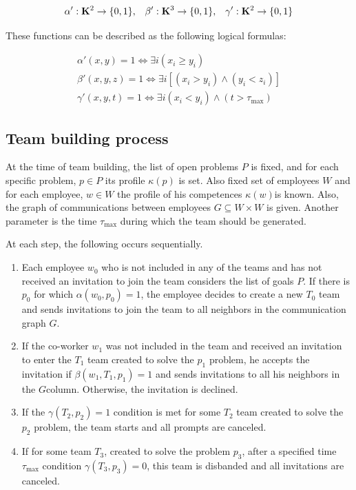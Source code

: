 \documentclass[12pt]{report}
\theoremstyle{definition}
\begin{document}
\begin{eqnarray} \label{eq:team5}
\alpha': {\bf K} ^2 \to \{0, 1\},\;\;\;
\beta': {\bf K} ^3 \to \{0, 1\},\;\;\;
\gamma': {\bf K} ^2 \to \{0, 1\}
\end{eqnarray}

These functions can be described as the following logical formulas:

\begin{eqnarray} \label{eq:team6}
\alpha'(x,y)=1 \iff \exists i (x_i \geq y_i) \\
\beta'(x,y,z)=1 \iff \exists i [(x_i > y_i) \wedge (y_i < z_i)]  \\
\gamma'(x,y,t)=1 \iff \exists i (x_i < y_i)  \wedge (t > \tau_{\max})
\end{eqnarray}

\subsection{Team building process}

At the time of team building, the list of open problems ${P}$ is fixed, and for each specific problem, $p\in {P}$ its profile $\kappa(p)$ is set. 
Also fixed set of employees $W$ and for each employee, $w\in W$ the profile of his competences $\kappa(w)$is known. 
Also, the graph of communications between employees $G\subseteq W\times W$ is given. 
Another parameter is the time $\tau_{\max}$ during which the team should be generated.

At each step, the following occurs sequentially.

\begin{enumerate}
	\item 
	Each employee $w_0$ who is not included in any of the teams and has not received an invitation to join the team considers the list of goals $P$. 
	If there is $p_0$ for which $\alpha (w_0,p_0)=1$, the employee decides to create a new $T_0$  team and sends invitations to join the team to all neighbors in the communication graph $G$.
	\item 
	If the co-worker $w_1$ was not included in the  team and received an invitation to enter the $T_1$  team created to solve the $p_1$ problem, he accepts the invitation if $\beta(w_1, T_1, p_1) = 1$ and sends invitations to all his neighbors in the $G$column. 
	Otherwise, the invitation is declined.
	\item 
	If the $\gamma(T_2, p_2)=1$ condition is met for some $T_2$  team created to solve the $p_2$ problem, the  team starts and all prompts are canceled.
	\item 
	If for some team $T_3$, created to solve the problem $p_3$, after a specified time $\tau_{\max}$ condition $\gamma(T_3,p_3)=0$, this  team is disbanded and all invitations are canceled.
\end{enumerate}
\end{document}

